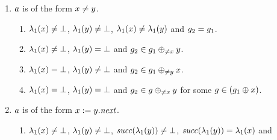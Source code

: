 {\begin{enumerate}
\begin{enumerate}
%
  \begin{enumerate}
  \item \label{pre:case:assignedA}%
    $\labeling_1(\xvar)\nequals\undef$, %
    $\labeling_1(\yvar)\nequals\undef$, %
    $\labeling_1(\xvar)=\labeling_1(\yvar)$ and
    $\graph_2=\graph_1\delVar{\xvar}$.
  \item \label{pre:case:assignedB}%
    $\labeling_1(\xvar)\neq\undef$, %
    $\labeling_1(\yvar)=\undef$ and
    $\graph_2=\graph\delVar\xvar$ where $\graph\addEqVar{\xvar}{\yvar}$.
  \item \label{pre:case:assignedC}%
    $\labeling_1(\xvar)=\undef$, %
    $\labeling_1(\yvar)\nequals\undef$ and %
    $\graph_2=\graph_1$.
  \item \label{pre:case:assignedD}%
    $\labeling_1(\xvar)=\undef$, %
    $\labeling_1(\yvar)\equals\undef$ and %
    $\graph_2\in\graph_1\addVar{\yvar}$.
  \end{enumerate}
\item $a$ is of the form $x\neq y$.
  \begin{enumerate}
  \item \label{pre:case:notEqualsA}%
    $\labeling_1(\xvar)\nequals\undef$, %
    $\labeling_1(\yvar)\nequals\undef$, %
    $\lambda_1(x)\neq\lambda_1(y)$ and $\graph_2=\graph_1$.
  \item \label{pre:case:notEqualsB}%
    $\labeling_1(\xvar)\neq\undef$, %
    $\labeling_1(\yvar)=\undef$ and %
    $g_2\in g_1\oplus_{\neq{\ensuremath{x}}}{y}$.
  \item \label{pre:case:notEqualsC}%
    $\labeling_1(\xvar)=\undef$, %
    $\lambda_1(y)\neq\bot$ and %
    $g_2\in g_1\oplus_{\neq{\ensuremath{y}}}{x}$.
  \item \label{pre:case:notEqualsD}%
    $\labeling_1(\xvar)=\undef$, %
    $\labeling_1(\yvar)=\undef$ and %
    $g_2\in g\oplus_{\neq{\ensuremath{x}}}{y}$ for some
    $g\in\left(g_1\oplus{\ensuremath{x}}\right)$.
  \end{enumerate}
\item $a$ is of the form $x:=y.{\it next}$.
%
  \begin{enumerate}
  \item \label{pre:case:assignedDotNextA}%
    $\labeling_1(\xvar)\neq\undef$, %
    $\lambda_1(y)\neq\bot$, %
    ${\it succ}(\lambda_1(y))\neq\bot$, %
    ${\it succ}(\lambda_1(y))=\lambda_1(x)$ and

\end{enumerate}
\end{enumerate}
\end{enumerate}}
